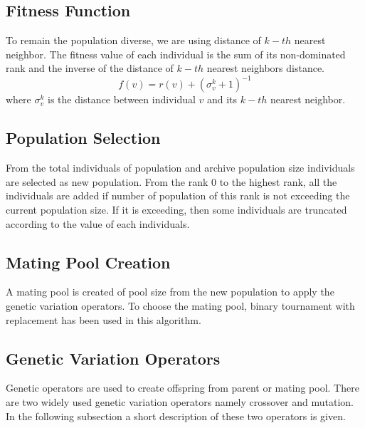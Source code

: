 \documentclass[12pt]{arsubmit}
\begin{document}
\subsection {Fitness Function}
To remain the population diverse, we are using distance of $k-th$ nearest neighbor. The fitness value of each individual is the sum of its non-dominated rank and the inverse of the distance of $k-th$ nearest neighbors distance. 
\begin{equation}
f(v) = r(v)+ {({\sigma}_v^k + 1)}^{-1}
\label{eq:density}
\end{equation}
where ${\sigma}_v^k$ is the distance between individual $v$ and its $k-th$ nearest neighbor.
\subsection {Population Selection}
From the total individuals of population and archive population size individuals are selected as new population. From the rank 0 to the highest rank, all the individuals are added if number of population of this rank is not exceeding the current population size. If it is exceeding, then some individuals are truncated according to the value of each individuals.
\subsection {Mating Pool Creation}
A mating pool is created of pool size from the new population to apply the genetic variation operators. To choose the mating pool, binary tournament with replacement has been used in this algorithm. 
\subsection {Genetic Variation Operators}
Genetic operators are used to create offspring from parent or mating pool. There are two widely used genetic variation operators namely crossover and mutation. In the following subsection a short description of these two operators is given. 

 
\end{document}
